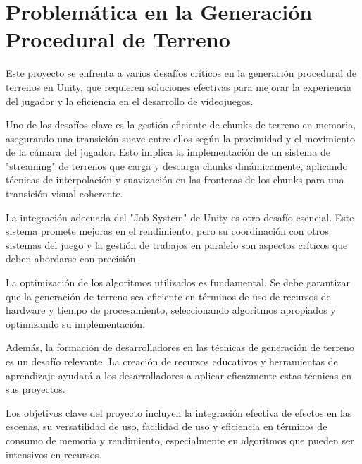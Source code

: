 \section{Problemática en la Generación Procedural de Terreno}

Este proyecto se enfrenta a varios desafíos críticos en la generación procedural de terrenos en Unity, que requieren soluciones efectivas para mejorar la experiencia del jugador y la eficiencia en el desarrollo de videojuegos.

Uno de los desafíos clave es la gestión eficiente de chunks de terreno en memoria, asegurando una transición suave entre ellos según la proximidad y el movimiento de la cámara del jugador. Esto implica la implementación de un sistema de "streaming" de terrenos que carga y descarga chunks dinámicamente, aplicando técnicas de interpolación y suavización en las fronteras de los chunks para una transición visual coherente.

La integración adecuada del "Job System" de Unity es otro desafío esencial. Este sistema promete mejoras en el rendimiento, pero su coordinación con otros sistemas del juego y la gestión de trabajos en paralelo son aspectos críticos que deben abordarse con precisión.

La optimización de los algoritmos utilizados es fundamental. Se debe garantizar que la generación de terreno sea eficiente en términos de uso de recursos de hardware y tiempo de procesamiento, seleccionando algoritmos apropiados y optimizando su implementación.

Además, la formación de desarrolladores en las técnicas de generación de terreno es un desafío relevante. La creación de recursos educativos y herramientas de aprendizaje ayudará a los desarrolladores a aplicar eficazmente estas técnicas en sus proyectos.

Los objetivos clave del proyecto incluyen la integración efectiva de efectos en las escenas, su versatilidad de uso, facilidad de uso y eficiencia en términos de consumo de memoria y rendimiento, especialmente en algoritmos que pueden ser intensivos en recursos.
